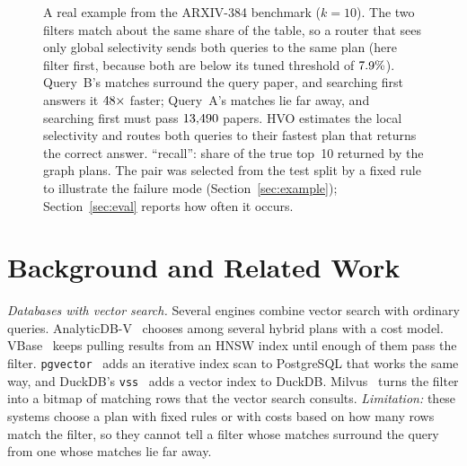 \documentclass[sigconf, nonacm]{acmart}
\newcommand{\Ppre}{\Pi_{\text{pre}}}
\newcommand{\Pfus}{\Pi_{\text{fused}}}
\newcommand{\Ppost}{\Pi_{\text{post}}}
\begin{document}
\begin{figure}[!t]
\begin{minipage}[t]{0.485\textwidth}
\end{minipage}
\caption{A real example from the ARXIV-384 benchmark ($k=10$). The two filters match about the same share of the table, so a router that sees only global selectivity sends both queries to the same plan (here filter first, because both are below its tuned threshold of $7.9\%$). Query~B's matches surround the query paper, and searching first answers it $48\times$ faster; Query~A's matches lie far away, and searching first must pass $13{,}490$ papers. HVO estimates the local selectivity and routes both queries to their fastest plan that returns the correct answer. ``recall'': share of the true top~10 returned by the graph plans. The pair was selected from the test split by a fixed rule to illustrate the failure mode (Section~\ref{sec:example}); Section~\ref{sec:eval} reports how often it occurs.}
\label{fig:example}
\end{figure}

\section{Background and Related Work}\label{sec:related}
\emph{Databases with vector search.} Several engines combine vector search with ordinary queries. AnalyticDB-V~\cite{wei2020analyticdbv} chooses among several hybrid plans with a cost model. VBase~\cite{zhang2023vbase} keeps pulling results from an HNSW index until enough of them pass the filter. \texttt{pgvector}~\cite{pgvector2024} adds an iterative index scan to PostgreSQL that works the same way, and DuckDB's \texttt{vss}~\cite{duckdbvss2024} adds a vector index to DuckDB. Milvus~\cite{wang2021milvus} turns the filter into a bitmap of matching rows that the vector search consults. \emph{Limitation:} these systems choose a plan with fixed rules or with costs based on how many rows match the filter, so they cannot tell a filter whose matches surround the query from one whose matches lie far away.
\end{document}
